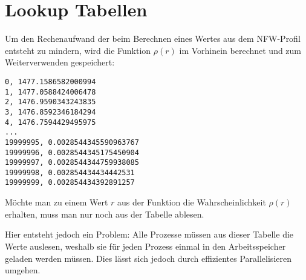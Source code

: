 \section*{Lookup Tabellen}

Um den Rechenaufwand der beim Berechnen eines Wertes aus dem NFW-Profil
entsteht zu mindern, wird die Funktion \( \rho(r)\) im Vorhinein
berechnet und zum Weiterverwenden gespeichert:

\lstset{
  frame=single,
  title=2e8.csv \qquad (\( \sim \) 500 MB)
}

\begin{lstlisting}
0, 1477.1586582000994
1, 1477.0588424006478
2, 1476.9590343243835
3, 1476.8592346184294
4, 1476.7594429495975
...
19999995, 0.0028544345590963767
19999996, 0.0028544345175450904
19999997, 0.0028544344759938085
19999998, 0.002854434434442531
19999999, 0.002854434392891257
\end{lstlisting}

Möchte man zu einem Wert \( r \) aus der Funktion die Wahrscheinlichkeit
\( \rho(r) \) erhalten, muss man nur noch aus der Tabelle ablesen.
\par
Hier entsteht jedoch ein Problem: Alle Prozesse müssen aus dieser Tabelle die
Werte auslesen, weshalb sie für jeden Prozess einmal in den Arbeitsspeicher
geladen werden müssen. Dies lässt sich jedoch durch effizientes Parallelisieren
umgehen.

